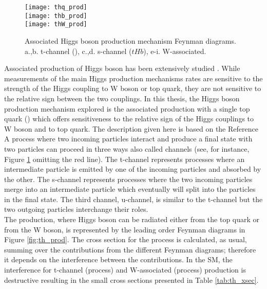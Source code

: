 \begin{figure}[h!]
\centering
\texttt{[image: thq\_prod]}\\
\texttt{[image: thb\_prod]}\\
\texttt{[image: thW\_prod]}\\
\caption[Associated Higgs boson production mechanism Feynman diagrams]{Associated Higgs boson production mechanism Feynman diagrams. a.,b. t-channel (\tHq), c.,d. s-channel ($tHb$), e-i. W-associated.}
\label{fig:th_prod}
\end{figure}

Associated production of Higgs boson has been extensively studied \cite{maltoni1, biswas, farina,tait, maltoni2}. While measurements of the main Higgs production mechanisms rates are sensitive to the strength of the Higgs coupling to W boson or top quark, they are not sensitive to the relative sign between the two couplings. In this thesis, the Higgs boson production mechanism explored is the associated production with a single top quark (\tH) which offers sensitiveness to the relative sign of the Higgs couplings to W boson and to top quark. The description given here is based on the Reference \cite{farina}\\

A process where two incoming particles interact and produce a final state with two particles can proceed in three ways also called channels (see, for instance, Figure \ref{fig:th_prod} omitting the red line). The t-channel represents processes where an intermediate particle is emitted by one of the incoming particles and absorbed by the other. The s-channel represents processes where the two incoming particles merge into an intermediate particle which eventually will split into the particles in the final state. The third channel, u-channel, is similar to the t-channel but the two outgoing particles interchange their roles.\\

The \tH production, where Higgs boson can be radiated either from the top quark or from the W boson, is represented by the leading order Feynman diagrams in Figure \ref{fig;th_prod}. The cross section for the \tH process is calculated, as usual, summing over the contributions from the different Feynman diagrams; therefore it depends on the interference between the contributions. In the SM, the interference for t-channel (\tHq process)  and W-associated (\tHW process) production is destructive \cite{maltoni1} resulting in the small cross sections presented in Table \ref{tab:th_xsec}. 

